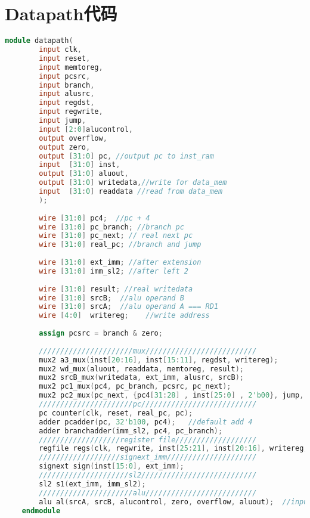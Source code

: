 \appendix
\section{Datapath代码}
\begin{lstlisting}[language=Verilog]
    module datapath(
        input clk,
        input reset,
        input memtoreg,
        input pcsrc,
        input branch,
        input alusrc,
        input regdst,
        input regwrite,
        input jump,
        input [2:0]alucontrol,
        output overflow,
        output zero,
        output [31:0] pc, //output pc to inst_ram
        input  [31:0] inst,
        output [31:0] aluout,
        output [31:0] writedata,//write for data_mem
        input  [31:0] readdata //read from data_mem
        );
        
        wire [31:0] pc4;  //pc + 4
        wire [31:0] pc_branch; //branch pc
        wire [31:0] pc_next; // real next pc
        wire [31:0] real_pc; //branch and jump
        
        wire [31:0] ext_imm; //after extension
        wire [31:0] imm_sl2; //after left 2
        
        wire [31:0] result; //real writedata
        wire [31:0] srcB;  //alu operand B
        wire [31:0] srcA;  //alu operand A === RD1
        wire [4:0]  writereg;    //write address
        
        assign pcsrc = branch & zero;
    
        //////////////////////mux//////////////////////////
        mux2 a3_mux(inst[20:16], inst[15:11], regdst, writereg);
        mux2 wd_mux(aluout, readdata, memtoreg, result);
        mux2 srcB_mux(writedata, ext_imm, alusrc, srcB);
        mux2 pc1_mux(pc4, pc_branch, pcsrc, pc_next);
        mux2 pc2_mux(pc_next, {pc4[31:28] , inst[25:0] , 2'b00}, jump, real_pc);
        //////////////////////pc///////////////////////////
        pc counter(clk, reset, real_pc, pc);
        adder pcadder(pc, 32'b100, pc4);   //default add 4
        adder branchadder(imm_sl2, pc4, pc_branch);
        ///////////////////register file///////////////////
        regfile regs(clk, regwrite, inst[25:21], inst[20:16], writereg, result, srcA, writedata);
        ///////////////////signext_imm/////////////////////
        signext sign(inst[15:0], ext_imm);
        /////////////////////sl2///////////////////////////
        sl2 s1(ext_imm, imm_sl2);
        //////////////////////alu//////////////////////////
        alu al(srcA, srcB, alucontrol, zero, overflow, aluout);  //input aluout to data_ram to get readdata
    endmodule
\end{lstlisting}
